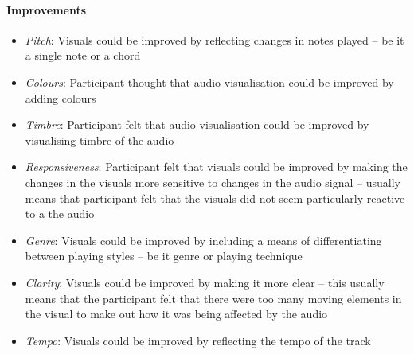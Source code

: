 \documentclass[../initial_thesis.tex]{subfiles}
\begin{document}
\paragraph{Improvements}
\begin{itemize}
\item {\emph{Pitch}: Visuals could be improved by reflecting changes in notes played – be it a single note or a chord}
\item {\emph{Colours}: Participant thought that audio-visualisation could be improved by adding colours}
\item {\emph{Timbre}: Participant felt that audio-visualisation could be improved by visualising timbre of the audio}
\item {\emph{Responsiveness}: Participant felt that visuals could be improved by making the changes in the visuals more sensitive to changes in the audio signal – usually means that participant felt that the visuals did not seem particularly reactive to a the audio}
\item {\emph{Genre}: Visuals could be improved by including a means of differentiating between playing styles – be it genre or playing technique}
\item {\emph{Clarity}: Visuals could be improved by making it more clear – this usually means that the participant felt that there were too many moving elements in the visual to make out how it was being affected by the audio}
\item {\emph{Tempo}: Visuals could be improved by reflecting the tempo of the track}
\end{itemize}
\end{document}

